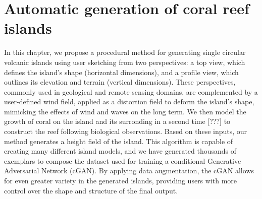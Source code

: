 \graphicspath{ {./Chapter 2/figures/cGAN/} }


\chapter{Automatic generation of coral reef islands}
\label{chap:coral-island}

\abstract 
In this chapter, we propose a procedural method for generating single circular volcanic islands using user sketching from two perspectives: a top view, which defines the island's shape (horizontal dimensions), and a profile view, which outlines its elevation and terrain (vertical dimensions). These perspectives, commonly used in geological and remote sensing domains, are complemented by a user-defined wind field, applied as a distortion field to deform the island's shape, mimicking the effects of wind and waves on the long term. We then model the growth of coral on the island and its surronding in a second time [???] to construct the reef following biological observations. Based on these inputs, our method generates a height field of the island. This algorithm is capable of creating many different island models, and we have generated thousands of exemplars to compose the dataset used for training a conditional Generative Adversarial Network (cGAN). By applying data augmentation, the cGAN allows for even greater variety in the generated islands, providing users with more control over the shape and structure of the final output.
\pagebreak 

